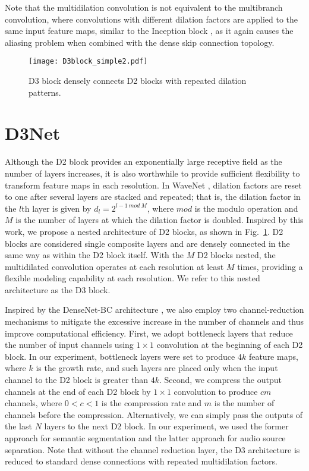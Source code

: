 \documentclass[final]{cvpr}
\begin{document}
Note that the multidilation convolution is not equivalent to the multibranch convolution, where convolutions with different dilation factors are applied to the same input feature maps, similar to the Inception block \cite{Szegedy15, Szegedy16}, as it again causes the aliasing problem when combined with the dense skip connection topology.
\begin{figure}[t]
  \centering
\texttt{[image: D3block\_simple2.pdf]}
  \caption{D3 block densely connects D2 blocks with repeated dilation patterns.}
  \label{fig:d3block}
\end{figure}


\section{D3Net}
\label{sec:d3}
Although the D2 block provides an exponentially large receptive field as the number of layers increases, it is also worthwhile to provide sufficient flexibility to transform feature maps in each resolution. In WaveNet \cite{Aaron2016WN}, dilation factors are reset to one after several layers are stacked and repeated; that is, the dilation factor in the $l$th layer is given by $d_l=2^{l-1~mod~M}$, where $mod$ is the modulo operation and $M$ is the number of layers at which the dilation factor is doubled. Inspired by this work, we propose a nested architecture of D2 blocks, as shown in Fig.~\ref{fig:d3block}. D2 blocks are considered single composite layers and are densely connected in the same way as within the D2 block itself. With the $M$ D2 blocks nested, the multidilated convolution operates at each resolution at least $M$ times, providing a flexible modeling capability at each resolution. We refer to this nested architecture as the D3 block. 

Inspired by the DenseNet-BC architecture \cite{Huang17Densenet}, we also employ two channel-reduction mechanisms to mitigate the excessive increase in the number of channels and thus improve computational efficiency. First, we adopt bottleneck layers that reduce the number of input channels using  $1\times1$ convolution at the beginning of each D2 block. In our experiment, bottleneck layers were set to produce $4k$ feature maps, where $k$ is the growth rate, and such layers are placed only when the input channel to the D2 block is greater than $4k$. Second, we compress the output channels at the end of each D2 block by $1\times1$ convolution to produce $cm$ channels, where $0<c<1$ is the compression rate and $m$ is the number of channels before the compression. Alternatively, we can simply pass the outputs of the last $N$ layers to the next D2 block. 
In our experiment, we used the former approach for semantic segmentation and the latter approach for audio source separation.
Note that without the channel reduction layer, the D3 architecture is reduced to standard dense connections with repeated multidilation factors.
\end{document}
